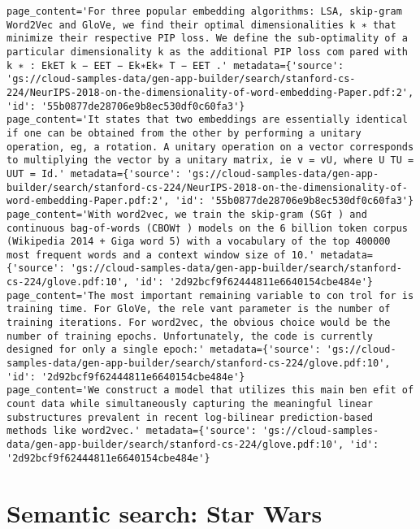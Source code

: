 \documentclass[
  letterpaper,
  DIV=11,
  numbers=noendperiod]{scrreprt}
\begin{document}
\begin{verbatim}
page_content='For three popular embedding algorithms: LSA, skip-gram Word2Vec and GloVe, we find their optimal dimensionalities k ∗ that minimize their respective PIP loss. We define the sub-optimality of a particular dimensionality k as the additional PIP loss com pared with k ∗ : EkET k − EET − Ek∗Ek∗ T − EET .' metadata={'source': 'gs://cloud-samples-data/gen-app-builder/search/stanford-cs-224/NeurIPS-2018-on-the-dimensionality-of-word-embedding-Paper.pdf:2', 'id': '55b0877de28706e9b8ec530df0c60fa3'}
page_content='It states that two embeddings are essentially identical if one can be obtained from the other by performing a unitary operation, eg, a rotation. A unitary operation on a vector corresponds to multiplying the vector by a unitary matrix, ie v = vU, where U TU = UUT = Id.' metadata={'source': 'gs://cloud-samples-data/gen-app-builder/search/stanford-cs-224/NeurIPS-2018-on-the-dimensionality-of-word-embedding-Paper.pdf:2', 'id': '55b0877de28706e9b8ec530df0c60fa3'}
page_content='With word2vec, we train the skip-gram (SG† ) and continuous bag-of-words (CBOW† ) models on the 6 billion token corpus (Wikipedia 2014 + Giga word 5) with a vocabulary of the top 400000 most frequent words and a context window size of 10.' metadata={'source': 'gs://cloud-samples-data/gen-app-builder/search/stanford-cs-224/glove.pdf:10', 'id': '2d92bcf9f62444811e6640154cbe484e'}
page_content='The most important remaining variable to con trol for is training time. For GloVe, the rele vant parameter is the number of training iterations. For word2vec, the obvious choice would be the number of training epochs. Unfortunately, the code is currently designed for only a single epoch:' metadata={'source': 'gs://cloud-samples-data/gen-app-builder/search/stanford-cs-224/glove.pdf:10', 'id': '2d92bcf9f62444811e6640154cbe484e'}
page_content='We construct a model that utilizes this main ben efit of count data while simultaneously capturing the meaningful linear substructures prevalent in recent log-bilinear prediction-based methods like word2vec.' metadata={'source': 'gs://cloud-samples-data/gen-app-builder/search/stanford-cs-224/glove.pdf:10', 'id': '2d92bcf9f62444811e6640154cbe484e'}
\end{verbatim}

\hypertarget{semantic-search-star-wars}{%
\chapter{Semantic search: Star Wars}\label{semantic-search-star-wars}}
\end{document}
